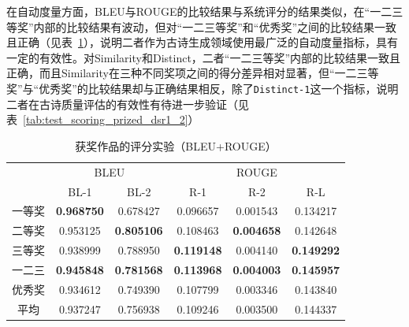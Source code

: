 在自动度量方面，BLEU与ROUGE的比较结果与系统评分的结果类似，在“一二三等奖”内部的比较结果有波动，但对“一二三等奖”和“优秀奖”之间的比较结果一致且正确（见表~\ref{tab:test_scoring_prized_dsr1_1}），说明二者作为古诗生成领域使用最广泛的自动度量指标，具有一定的有效性。对Similarity和Distinct，二者“一二三等奖”内部的比较结果一致且正确，而且Similarity在三种不同奖项之间的得分差异相对显著，但“一二三等奖”与“优秀奖”的比较结果却与正确结果相反，除了\verb|Distinct-1|这一个指标，说明二者在古诗质量评估的有效性有待进一步验证（见表~\ref{tab:test_scoring_prized_dsr1_2}）

\begin{table}[ht]
  \centering
  \caption{获奖作品的评分实验（BLEU+ROUGE）}
  \label{tab:test_scoring_prized_dsr1_1}
  \begin{tabular}{cccccc}
      \toprule
      &  \multicolumn{2}{c}{BLEU} & \multicolumn{3}{c}{ROUGE}\\
      \cmidrule(r){2-3} \cmidrule(l){4-6}
       & BL-1& BL-2& R-1& R-2& R-L\\
      \midrule
      一等奖	&	\textbf{0.968750} 	&	0.678427 	&	0.096657 	&	0.001543 	&	0.134217 	\\
      二等奖	&	0.953125 	&	\textbf{0.805106} 	&	0.108463 	&	\textbf{0.004658} 	&	0.142648 	\\
      三等奖	&	0.938999 	&	0.788950 	&	\textbf{0.119148} 	&	0.004140 	&	\textbf{0.149292} 	\\
      \cmidrule{2-6} %
      一二三	&	\textbf{0.945848} 	&	\textbf{0.781568} 	&	\textbf{0.113968} 	&	\textbf{0.004003} 	&	\textbf{0.145957} 	\\
      优秀奖	&	0.934612 	&	0.749390 	&	0.107799 	&	0.003346 	&	0.143840 	\\
      \cmidrule{2-6} %
      平均	&	0.937247 	&	0.756938 	&	0.109246 	&	0.003500 	&	0.144337 	\\
      \bottomrule
  \end{tabular}
\end{table}

